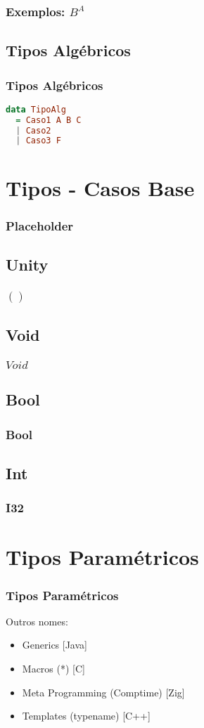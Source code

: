 \documentclass{beamer}
\begin{document}
\begin{frame}
    \frametitle{Exemplos: \(B^A\)}
\end{frame}

\subsection{Tipos Algébricos}
\begin{frame}[fragile]
    \frametitle{Tipos Algébricos}
    \begin{lstlisting}[language=Haskell]
data TipoAlg
  = Caso1 A B C
  | Caso2
  | Caso3 F
    \end{lstlisting}
\end{frame}

\section{Tipos - Casos Base}
\begin{frame}
    \frametitle{Placeholder}
\end{frame}

\subsection{Unity}
\begin{frame}
    \frametitle{\(()\)}
\end{frame}

\subsection{Void}
\begin{frame}
    \frametitle{\(Void\)}
\end{frame}

\subsection{Bool}
\begin{frame}
    \frametitle{Bool}
\end{frame}

\subsection{Int}
\begin{frame}
    \frametitle{I32}
\end{frame}

\section{Tipos Paramétricos}
\begin{frame}
    \frametitle{Tipos Paramétricos}
    Outros nomes:
    \begin{itemize}
        \item Generics [Java]
        \item Macros (*) [C]
        \item Meta Programming (Comptime) [Zig]
        \item Templates (typename) [C++]
    \end{itemize}
\end{frame}
\end{document}
